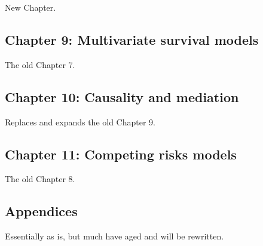 \documentclass[a4paper,11pt]{article}
\begin{document}
New Chapter.

\subsection*{Chapter 9: Multivariate survival models}

The old Chapter 7.

\subsection*{Chapter 10: Causality and mediation}

Replaces and expands the old Chapter 9.

\subsection*{Chapter 11: Competing risks models}

The old Chapter 8.

\subsection*{Appendices}

Essentially as is, but much have aged and will be rewritten.


\end{document}
